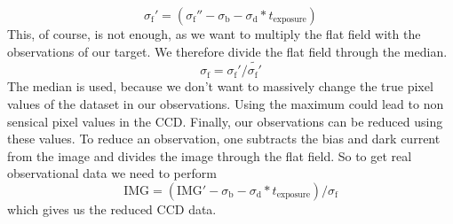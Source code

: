 \documentclass{article}
\begin{document}
\begin{equation}
    \sigma_\text{f}' = (\sigma_\text{f}'' {-}\sigma_\text{b} {-}\sigma_\text{d}*t_\text{exposure})
\end{equation}
This, of course, is not enough, as we want to multiply the flat field with the observations of our target. We therefore divide the flat field through the median.
\begin{equation}
    \sigma_\text{f} = \sigma_\text{f}'/\widetilde{\sigma_\text{f}'} 
\end{equation}
The median is used, because we don't want to massively change the true pixel values of the dataset in our observations. Using the maximum could lead to non sensical pixel values in the CCD.\newline
Finally, our observations can be reduced using these values. To reduce an observation, one subtracts the bias and dark current from the image and divides the image through the flat field. So to get real observational data we need to perform
\begin{equation}
    \text{IMG} = (\text{IMG}' {-}\sigma_\text{b} {-}\sigma_\text{d}*t_\text{exposure})/\sigma_\text{f}
\end{equation}
which gives us the reduced CCD data.
\end{document}
